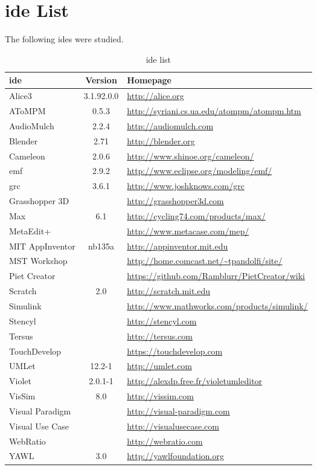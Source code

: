 \section{\acs{ide} List}
\label{sec:ide_list}

The following \acp{ide} were studied.

\noindent
\begin{table}[!htb]\centering
{}
\label{table:ides}
\begin{tabularx}{\textwidth}{@{}lcX@{}}\toprule
  \textbf{\ac{ide}} & \textbf{Version} & \textbf{Homepage} \\
  \midrule
  Alice3 & 3.1.92.0.0 & \url{http://alice.org} \\
  AToMPM & 0.5.3 & \url{http://syriani.cs.ua.edu/atompm/atompm.htm} \\
  AudioMulch & 2.2.4 & \url{http://audiomulch.com} \\
  Blender & 2.71 & \url{http://blender.org} \\
  Cameleon & 2.0.6 & \url{http://www.shinoe.org/cameleon/} \\
  \ac{emf} & 2.9.2 & \url{http://www.eclipse.org/modeling/emf/} \\
  \ac{grc} & 3.6.1 & \url{http://www.joshknows.com/grc} \\
  Grasshopper 3D & & \url{http://grasshopper3d.com} \\
  Max & 6.1 & \url{http://cycling74.com/products/max/} \\
  MetaEdit+ & & \url{http://www.metacase.com/mep/} \\
  MIT AppInventor & nb135a & \url{http://appinventor.mit.edu} \\
  MST Workshop & & \url{http://home.comcast.net/~tpandolfi/site/} \\
  Piet Creator & & \url{https://github.com/Ramblurr/PietCreator/wiki} \\
  Scratch & 2.0 & \url{http://scratch.mit.edu} \\
  Simulink & & \url{http://www.mathworks.com/products/simulink/} \\
  Stencyl & & \url{http://stencyl.com} \\
  Tersus & & \url{http://tersus.com} \\
  TouchDevelop & & \url{https://touchdevelop.com} \\
  UMLet & 12.2-1 & \url{http://umlet.com} \\
  Violet & 2.0.1-1 & \url{http://alexdp.free.fr/violetumleditor} \\
  VisSim & 8.0 & \url{http://vissim.com} \\
  Visual Paradigm & & \url{http://visual-paradigm.com} \\
  Visual Use Case & & \url{http://visualusecase.com} \\
  WebRatio & & \url{http://webratio.com} \\
  YAWL & 3.0 & \url{http://yawlfoundation.org} \\
  \bottomrule
\end{tabularx}
\caption{\ac{ide} list}
\end{table}
